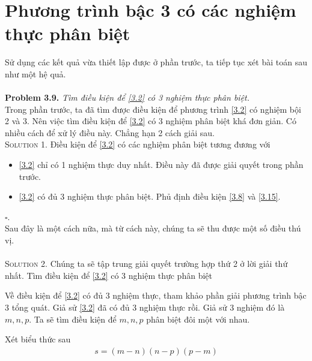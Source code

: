 \documentclass[a4paper,oneside]{book}
\numberwithin{equation}{chapter}
\begin{document}
\section{Phương trình bậc 3 có các nghiệm thực phân biệt}
Sử dụng các kết quả vừa thiết lập được ở phần trước, ta tiếp tục xét bài toán sau như một hệ quả.\\
\\
\textbf{Problem 3.9.} \textit{Tìm điều kiện để \eqref{3.2} có 3 nghiệm thực phân biệt.}\\

Trong phần trước, ta đã tìm được điều kiện để phương trình \eqref{3.2} có nghiệm bội 2 và 3. Nên việc tìm điều kiện để \eqref{3.2} có 3 nghiệm phân biệt khá đơn giản. Có nhiều cách để xử lý điều này. Chẳng hạn 2 cách giải sau.
\\
\textsc{Solution 1.} Điều kiện để \eqref{3.2} có các nghiệm phân biệt tương đương với
\begin{itemize}
\item \eqref{3.2} chỉ có 1 nghiệm thực duy nhất. Điều này đã được giải quyết trong phần trước.
\item \eqref{3.2} có đủ 3 nghiệm thực phân biệt. Phủ định điều kiện \eqref{3.8} và \eqref{3.15}.
\end{itemize}
\hfill $\square$.\\


Sau đây là một cách nữa, mà từ cách này, chúng ta sẽ thu được một số điều thú vị.\\
\\
\textsc{Solution 2.} 
Chúng ta sẽ tập trung giải quyết trường hợp thứ 2 ở lời giải thứ nhất. Tìm điều kiện để \eqref{3.2} có 3 nghiệm thực phân biệt

Về điều kiện để \eqref{3.2} có đủ 3 nghiệm thực, tham khảo phần giải phương trình bậc 3 tổng quát. Giả sử \eqref{3.2} đã có đủ 3 nghiệm thực rồi. Giả sử 3 nghiệm đó là $m,n,p$. Ta sẽ tìm điều kiện để $m,n,p$ phân biệt đôi một với nhau.

Xét biểu thức sau
\begin{align}
s = \left( {m - n} \right)\left( {n - p} \right)\left( {p - m} \right)
 \end{align}
 
\end{document}
